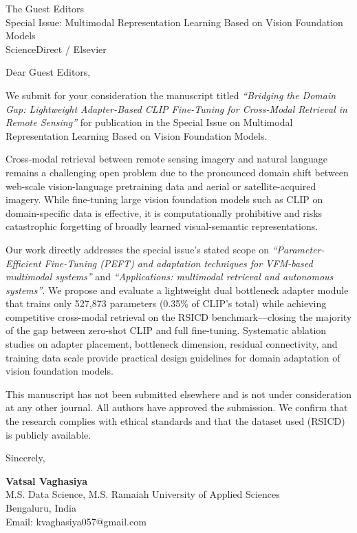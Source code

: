\documentclass[12pt]{letter}
\begin{document}
\begin{letter}{The Guest Editors\\
Special Issue: Multimodal Representation Learning Based on Vision Foundation Models\\
ScienceDirect / Elsevier}

\opening{Dear Guest Editors,}

We submit for your consideration the manuscript titled
\textit{``Bridging the Domain Gap: Lightweight Adapter-Based CLIP
Fine-Tuning for Cross-Modal Retrieval in Remote Sensing''} for
publication in the Special Issue on Multimodal Representation Learning
Based on Vision Foundation Models.

Cross-modal retrieval between remote sensing imagery and natural language
remains a challenging open problem due to the pronounced domain shift
between web-scale vision-language pretraining data and aerial or
satellite-acquired imagery. While fine-tuning large vision foundation
models such as CLIP on domain-specific data is effective, it is
computationally prohibitive and risks catastrophic forgetting of broadly
learned visual-semantic representations.

Our work directly addresses the special issue's stated scope on
\textit{``Parameter-Efficient Fine-Tuning (PEFT) and adaptation techniques
for VFM-based multimodal systems''} and \textit{``Applications: multimodal
retrieval and autonomous systems''}. We propose and evaluate a lightweight
dual bottleneck adapter module that trains only 527,873 parameters
(0.35\% of CLIP's total) while achieving competitive cross-modal
retrieval on the RSICD benchmark---closing the majority of the gap
between zero-shot CLIP and full fine-tuning. Systematic ablation studies
on adapter placement, bottleneck dimension, residual connectivity, and
training data scale provide practical design guidelines for domain
adaptation of vision foundation models.

This manuscript has not been submitted elsewhere and is not under
consideration at any other journal. All authors have approved the
submission. We confirm that the research complies with ethical standards
and that the dataset used (RSICD) is publicly available.

\closing{Sincerely,}

\textbf{Vatsal Vaghasiya}\\
M.S. Data Science, M.S. Ramaiah University of Applied Sciences\\
Bengaluru, India\\
Email: kvaghasiya057@gmail.com

\end{letter}
\end{document}
